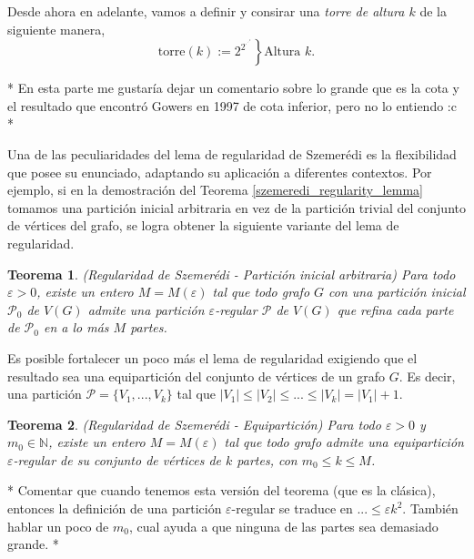 \documentclass{article}[14pts]
\newcommand{\hh}[1]{{\color{red} * #1 *}}
\newcommand{\fs}[1]{{\color{blue}* #1 *}}
\newtheorem{teorema}{Teorema}
\let\varepsilon=\varepsilon
\begin{document}
Desde ahora en adelante, vamos a definir y consirar una \emph{torre de altura $k$} de la siguiente manera,
\begin{equation}
    \mathrm{torre}(k) := \left.2^{2^{\cdot^{\cdot^{\cdot^{2}}}}}\right\rbrace \text{Altura } k.
\end{equation}\medskip

\hh{En esta parte me gustaría dejar un comentario sobre lo grande que es la cota y el resultado que encontró Gowers en 1997 de cota inferior, pero no lo entiendo :c}\medskip

Una de las peculiaridades del lema de regularidad de Szemerédi es la flexibilidad que posee su enunciado, adaptando su aplicación a diferentes contextos. Por ejemplo, si en la demostración del Teorema \ref{szemeredi_regularity_lemma} tomamos una partición inicial arbitraria en vez de la partición trivial del conjunto de vértices del grafo, se logra obtener la siguiente variante del lema de regularidad.\medskip

\begin{teorema} \label{Regularidad_part_ini} (Regularidad de Szemerédi - Partición inicial arbitraria)
    Para todo $\varepsilon > 0$, existe un entero $M=M(\varepsilon)$ tal que todo grafo $G$ con una partición inicial $\mathcal{P}_0$ de $V(G)$ admite una partición $\varepsilon$-regular $\mathcal{P}$ de $V(G)$ que refina cada parte de $\mathcal{P}_0$ en a lo más $M$ partes.
\end{teorema}\medskip

Es posible fortalecer un poco más el lema de regularidad exigiendo que el resultado sea una equipartición del conjunto de vértices de un grafo $G$. Es decir, una partición $\mathcal{P} = \lbrace V_1,...,V_k \rbrace$ tal que $|V_1|\leq |V_2|\leq ...\leq |V_k| = |V_1| +1$.\medskip

\begin{teorema} \label{Regularidad_equipart} (Regularidad de Szemerédi - Equipartición)
    Para todo $\varepsilon > 0$ y $m_0\in\mathbb{N}$, existe un entero $M = M(\varepsilon)$ tal que todo grafo admite una equipartición $\varepsilon$-regular de su conjunto de vértices de $k$ partes, con $m_0\leq k\leq M$. 
\end{teorema}\medskip

\fs{Comentar que cuando tenemos esta versión del teorema (que es la clásica), entonces la definición de una partición $\varepsilon$-regular se traduce en $...\leq\varepsilon k^{2}$. También hablar un poco de $m_0$, cual ayuda a que ninguna de las partes sea demasiado grande.}\medskip
\end{document}
